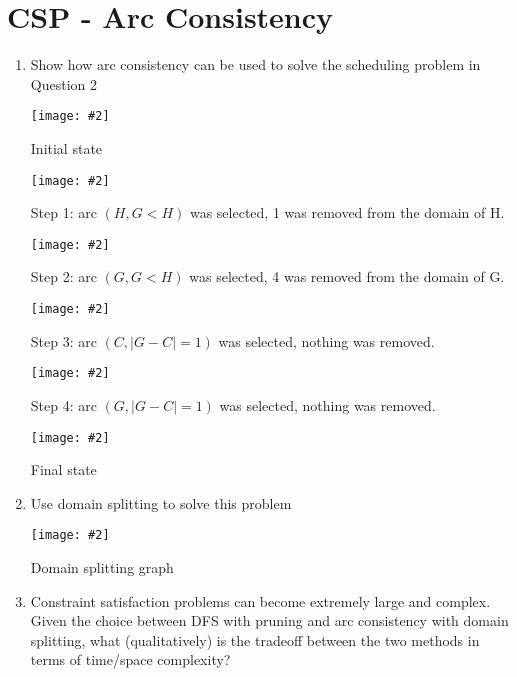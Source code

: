 \documentclass{article}
\def\ans#1{{\color{ans}#1}}
\newcommand{\centerfig}[2]{\begin{center}\texttt{[image: \#2]}\end{center}}
\begin{document}
\section{CSP - Arc Consistency}
\begin{enumerate}[label=(\alph*)]
    \item Show how arc consistency can be used to solve the scheduling problem in Question 2
    \centerfig{0.7}{../figs/q3_a_1.jpeg}
    {
        \begin{center}\color{ans}
            Initial state
        \end{center}
    }
    \centerfig{0.7}{../figs/q3_a_2.jpeg}
    {
        \begin{center}\color{ans}
            Step 1: arc $(H, G<H)$ was selected, 1 was removed from the domain of H.
        \end{center}
    }
    \centerfig{0.7}{../figs/q3_a_3.jpeg}
    {
        \begin{center}\color{ans}
            Step 2: arc $(G, G<H)$ was selected, 4 was removed from the domain of G.
        \end{center}
    }
    \centerfig{0.7}{../figs/q3_a_4.jpeg}
    {
        \begin{center}\color{ans}
            Step 3: arc $(C, |G-C|=1)$ was selected, nothing was removed.
        \end{center}
    }
    \centerfig{0.7}{../figs/q3_a_2.jpeg}
    {
        \begin{center}\color{ans}
            Step 4: arc $(G, |G-C|=1)$ was selected, nothing was removed.
        \end{center}
    }
    \centerfig{0.7}{../figs/q3_a_6.jpeg}
    {
        \begin{center}\color{ans}
            Final state
        \end{center}
    }
    \item Use domain splitting to solve this problem
    \centerfig{0.8}{../figs/q3_b.png}
    {
        \begin{center}\color{ans}
            Domain splitting graph
        \end{center}
    }
    \item Constraint satisfaction problems can become extremely large and complex. Given the choice between DFS with pruning and arc consistency with domain splitting, what (qualitatively) is the tradeoff between the two methods in terms of time/space complexity? \\ \\
    \ans{
}
\end{enumerate}
\end{document}
